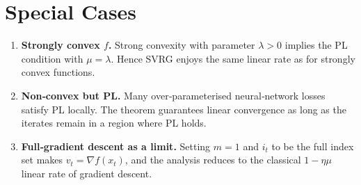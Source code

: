 \documentclass{article}
\newcommand{\grad}{\nabla}
\begin{document}
\section*{Special Cases}
\begin{enumerate}[label={\bf Case \arabic*:}, leftmargin=*]
\item \textbf{Strongly convex $f$.}  Strong convexity with parameter $\lambda>0$ implies the PL condition with $\mu=\lambda$.  Hence SVRG enjoys the same linear rate as for strongly convex functions.
\item \textbf{Non‑convex but PL.}  Many over‑parameterised neural‑network losses satisfy PL locally.  The theorem guarantees linear convergence as long as the iterates remain in a region where PL holds.
\item \textbf{Full‑gradient descent as a limit.}  Setting $m=1$ and $i_t$ to be the full index set makes $v_t=\grad f(x_t)$, and the analysis reduces to the classical $1-\eta\mu$ linear rate of gradient descent.
\end{enumerate}
\end{document}
